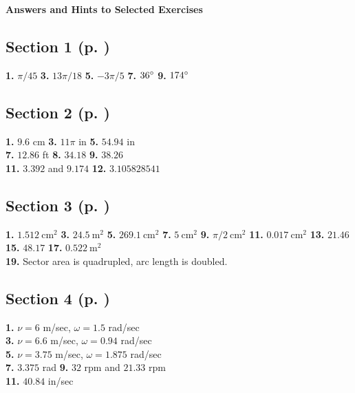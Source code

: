 \newpage

\textsf{\textbf{\Large Answers and Hints to Selected Exercises}}
\begin{multicols}{2}
\subsection*{Section 1 (p. \pageref{sec4dot1})}
\textbf{1.} $\pi/45$ \quad \textbf{3.} $13\pi/18$ \quad \textbf{5.} $-3\pi/5$ \quad
\textbf{7.} $36^\circ$ \quad \textbf{9.} $174^\circ$
\subsection*{Section 2 (p. \pageref{sec4dot2})}
\textbf{1.} $9.6$ cm \quad \textbf{3.} $11\pi$ in \quad \textbf{5.} $54.94$ in\\
\textbf{7.} $12.86$ ft \quad \textbf{8.} $34.18$ \quad \textbf{9.} $38.26$\\
\textbf{11.} $3.392$ and $9.174$ \quad \textbf{12.} $3.105828541$
\subsection*{Section 3 (p. \pageref{sec4dot3})}
\textbf{1.} $1.512~\text{cm}^2$ \quad \textbf{3.} $24.5~\text{m}^2$ \quad
\textbf{5.} $269.1~\text{cm}^2$ \quad \textbf{7.} $5~\text{cm}^2$ \quad
\textbf{9.} $\pi/2~\text{cm}^2$ \quad \textbf{11.} $0.017~\text{cm}^2$ \quad
\textbf{13.} $21.46$ \quad \textbf{15.} $48.17$ \quad \textbf{17.} $0.522~\text{m}^2$\\
\textbf{19.} Sector area is quadrupled, arc length is doubled.
\subsection*{Section 4 (p. \pageref{sec4dot4})}
\textbf{1.} $\nu=6$ m/sec, $\omega=1.5$ rad/sec\\
\textbf{3.} $\nu=6.6$ m/sec, $\omega=0.94$ rad/sec\\
\textbf{5.} $\nu=3.75$ m/sec, $\omega=1.875$ rad/sec\\
\textbf{7.} $3.375$ rad \quad \textbf{9.} $32$ rpm and $21.33$ rpm\\
\textbf{11.} $40.84$ in/sec

\end{multicols}
